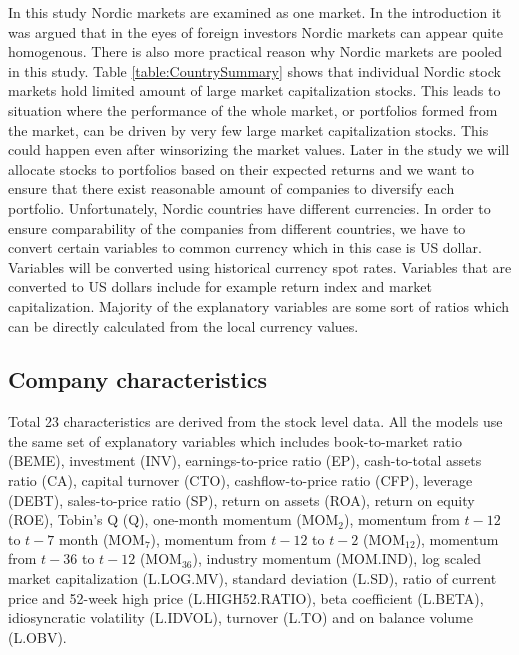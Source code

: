\documentclass{article}
\begin{document}
In this study Nordic markets are examined as one market. In the introduction it was argued that in the eyes of foreign investors Nordic markets can appear quite homogenous. There is also more practical reason why Nordic markets are pooled in this study. Table \ref{table:CountrySummary} shows that individual Nordic stock markets hold limited amount of large market capitalization stocks. This leads to situation where the performance of the whole market, or portfolios formed from the market, can be driven by very few large market capitalization stocks. This could happen even after winsorizing the market values. Later in the study we will allocate stocks to portfolios based on their expected returns and we want to ensure that there exist reasonable amount of companies to diversify each portfolio. Unfortunately, Nordic countries have different currencies. In order to ensure comparability of the companies from different countries, we have to convert certain variables to common currency which in this case is US dollar. Variables will be converted using historical currency spot rates. Variables that are converted to US dollars include for example return index and market capitalization. Majority of the explanatory variables are some sort of ratios which can be directly calculated from the local currency values. \par

\subsection{Company characteristics}\label{CompanyCharacteristics}

Total 23 characteristics are derived from the stock level data. All the models use the same set of explanatory variables which includes book-to-market ratio (BEME), investment (INV), earnings-to-price ratio (EP), cash-to-total assets ratio (CA), capital turnover (CTO), cashflow-to-price ratio (CFP), leverage (DEBT), sales-to-price ratio (SP), return on assets (ROA), return on equity (ROE), Tobin's Q (Q), one-month momentum (MOM$_2$), momentum from $t-12$ to $t-7$ month (MOM$_7$), momentum from $t-12$ to $t-2$ (MOM$_{12}$), momentum from $t-36$ to $t-12$ (MOM$_{36}$), industry momentum (MOM.IND), log scaled market capitalization (L.LOG.MV), standard deviation (L.SD), ratio of current price and 52-week high price (L.HIGH52.RATIO), beta coefficient (L.BETA), idiosyncratic volatility (L.IDVOL), turnover (L.TO) and on balance volume (L.OBV). \par
\end{document}
